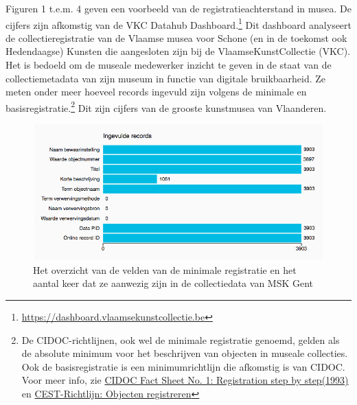 \documentclass[fleqn,10pt]{voorstel}
\begin{document}
Figuren 1 t.e.m. 4 geven een voorbeeld van de registratieachterstand in musea. De cijfers zijn afkomstig van de VKC Datahub Dashboard.\footnote{\url{https://dashboard.vlaamsekunstcollectie.be}} Dit dashboard analyseert de collectieregistratie van de Vlaamse musea voor Schone (en in de toekomst ook Hedendaagse) Kunsten die aangesloten zijn bij de VlaamseKunstCollectie (VKC). Het is bedoeld om de museale medewerker inzicht te geven in de staat van de collectiemetadata van zijn museum in functie van digitale bruikbaarheid. Ze meten onder meer hoeveel records ingevuld zijn volgens de minimale en basisregistratie.\footnote{De CIDOC-richtlijnen, ook wel de minimale registratie genoemd, gelden als de absolute minimum voor het beschrijven van objecten in museale collecties. Ook de basisregistratie is een minimumrichtlijn die afkomstig is van CIDOC. Voor meer info, zie \href{http://network.icom.museum/fileadmin/user_upload/minisites/cidoc/DocStandards/CIDOC_Fact_Sheet_No_1.pdf}{CIDOC Fact Sheet No. 1: Registration step by step(1993)} en \href{https://www.projectcest.be/wiki/Richtlijn:Objecten_registreren}{CEST-Richtlijn: Objecten registreren}} Dit zijn cijfers van de grooste kunstmusea van Vlaanderen. 

\begin{figure}[h]
	\caption{Het overzicht van de velden van de minimale registratie en het aantal keer dat ze aanwezig zijn in de collectiedata van MSK Gent}
	\centering
	\includegraphics[width=\linewidth]{pictures/VKC_velden_minimale}
\end{figure}
\end{document}
